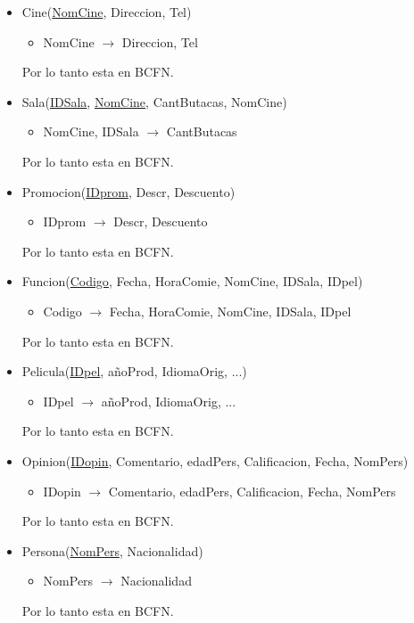 \documentclass{article}
\begin{document}
  \begin{itemize}
    \item Cine(\underline{NomCine}, Direccion, Tel)
      \begin{itemize}
          \item NomCine $\rightarrow$ Direccion, Tel
      \end{itemize}
      Por lo tanto esta en BCFN.
    \item Sala(\underline{IDSala}, \underline{NomCine}, CantButacas, NomCine)
      \begin{itemize}
          \item NomCine, IDSala $\rightarrow$ CantButacas
      \end{itemize}
      Por lo tanto esta en BCFN.
    \item Promocion(\underline{IDprom}, Descr, Descuento)
      \begin{itemize}
          \item IDprom $\rightarrow$ Descr, Descuento
      \end{itemize}
      Por lo tanto esta en BCFN.
    \item Funcion(\underline{Codigo}, Fecha, HoraComie, NomCine, IDSala, IDpel)
      \begin{itemize}
          \item Codigo $\rightarrow$ Fecha, HoraComie, NomCine, IDSala, IDpel
      \end{itemize}
      Por lo tanto esta en BCFN.
    \item Pelicula(\underline{IDpel}, añoProd, IdiomaOrig, ...)
      \begin{itemize}
          \item IDpel $\rightarrow$ añoProd, IdiomaOrig, ...
      \end{itemize}
      Por lo tanto esta en BCFN.
    \item Opinion(\underline{IDopin}, Comentario, edadPers, Calificacion, Fecha, NomPers)
      \begin{itemize}
          \item IDopin $\rightarrow$ Comentario, edadPers, Calificacion, Fecha, NomPers
      \end{itemize}
      Por lo tanto esta en BCFN.
    \item Persona(\underline{NomPers}, Nacionalidad)
      \begin{itemize}
          \item NomPers $\rightarrow$ Nacionalidad
      \end{itemize}
      Por lo tanto esta en BCFN.

\end{itemize}
\end{document}
